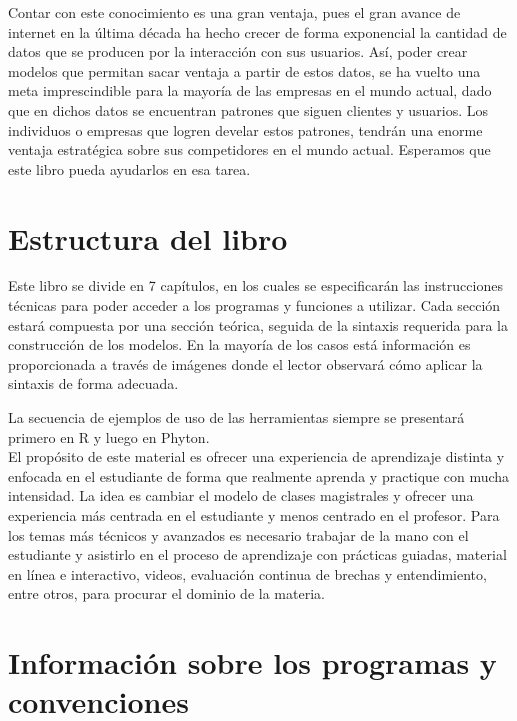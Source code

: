 \documentclass[12pt,]{krantz}
\begin{document}
Contar con este conocimiento es una gran ventaja, pues el gran avance de internet en la última década ha hecho crecer de forma exponencial la cantidad de datos que se producen por la interacción con sus usuarios. Así, poder crear modelos que permitan sacar ventaja a partir de estos datos, se ha vuelto una meta imprescindible para la mayoría de las empresas en el mundo actual, dado que en dichos datos se encuentran patrones que siguen clientes y usuarios. Los individuos o empresas que logren develar estos patrones, tendrán una enorme ventaja estratégica sobre sus competidores en el mundo actual. Esperamos que este libro pueda ayudarlos en esa tarea.

\hypertarget{estructura-del-libro}{%
\section*{Estructura del libro}\label{estructura-del-libro}}


Este libro se divide en 7 capítulos, en los cuales se especificarán las instrucciones técnicas para poder acceder a los programas y funciones a utilizar. Cada sección estará compuesta por una sección teórica, seguida de la sintaxis requerida para la construcción de los modelos. En la mayoría de los casos está información es proporcionada a través de imágenes donde el lector observará cómo aplicar la sintaxis de forma adecuada.

La secuencia de ejemplos de uso de las herramientas siempre se presentará primero en R y luego en Phyton.\\
El propósito de este material es ofrecer una experiencia de aprendizaje distinta y enfocada en el estudiante de forma que realmente aprenda y practique con mucha intensidad. La idea es cambiar el modelo de clases magistrales y ofrecer una experiencia más centrada en el estudiante y menos centrado en el profesor. Para los temas más técnicos y avanzados es necesario trabajar de la mano con el estudiante y asistirlo en el proceso de aprendizaje con prácticas guiadas, material en línea e interactivo, videos, evaluación continua de brechas y entendimiento, entre otros, para procurar el dominio de la materia.

\hypertarget{informacion-sobre-los-programas-y-convenciones}{%
\section*{Información sobre los programas y convenciones}\label{informacion-sobre-los-programas-y-convenciones}}
\end{document}
